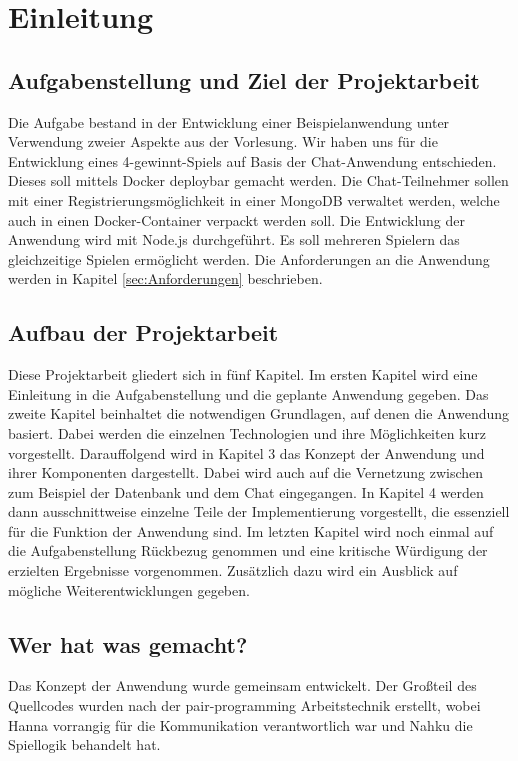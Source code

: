 
\chapter{Einleitung}\label{cha:Einleitung}

\section{Aufgabenstellung und Ziel der Projektarbeit}\label{sec:Aufgabenstellung}
Die Aufgabe bestand in der Entwicklung einer Beispielanwendung unter Verwendung zweier Aspekte aus der Vorlesung. Wir haben uns für die Entwicklung eines 4-gewinnt-Spiels auf Basis der Chat-Anwendung entschieden. Dieses soll mittels Docker deploybar gemacht werden. Die Chat-Teilnehmer sollen mit einer Registrierungsmöglichkeit in einer MongoDB verwaltet werden, welche auch in einen Docker-Container verpackt werden soll. Die Entwicklung der Anwendung wird mit Node.js durchgeführt. Es soll mehreren Spielern das gleichzeitige Spielen ermöglicht werden. Die Anforderungen an die Anwendung werden in Kapitel \ref{sec:Anforderungen} beschrieben.
\section{Aufbau der Projektarbeit}\label{sec:Aufbau}
Diese Projektarbeit gliedert sich in fünf Kapitel. Im ersten Kapitel wird eine Einleitung in die Aufgabenstellung und die geplante Anwendung gegeben. Das zweite Kapitel beinhaltet die notwendigen Grundlagen, auf denen die Anwendung basiert. Dabei werden die einzelnen Technologien und ihre Möglichkeiten kurz vorgestellt. Darauffolgend wird in Kapitel 3 das Konzept der Anwendung und ihrer Komponenten dargestellt. Dabei wird auch auf die Vernetzung zwischen zum Beispiel der Datenbank und dem Chat eingegangen. In Kapitel 4 werden dann ausschnittweise einzelne Teile der Implementierung vorgestellt, die essenziell für die Funktion der Anwendung sind. Im letzten Kapitel wird noch einmal auf die Aufgabenstellung Rückbezug genommen und eine kritische Würdigung der erzielten Ergebnisse vorgenommen. Zusätzlich dazu wird ein Ausblick auf mögliche Weiterentwicklungen gegeben.
\section{Wer hat was gemacht?}\label{sec:Aufteilung}
Das Konzept der Anwendung wurde gemeinsam entwickelt. Der Großteil des Quellcodes wurden nach der pair-programming Arbeitstechnik erstellt, wobei Hanna vorrangig für die Kommunikation verantwortlich war und Nahku die Spiellogik behandelt hat.